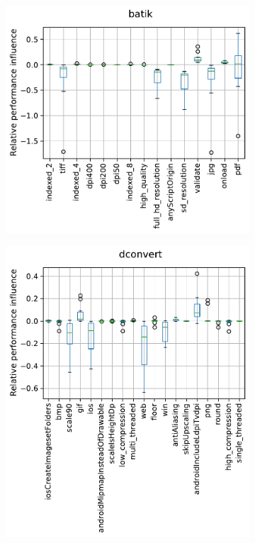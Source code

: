 \begin{figure}
	\begin{minipage}{0.33\textwidth}
		\begin{subfigure}{\linewidth}
			\includegraphics[width=\linewidth]{images/rq2/relative_performance_batik.pdf}			
			\vspace{15mm}
		\end{subfigure}
	\end{minipage}
	\begin{minipage}{0.33\textwidth}
		\begin{subfigure}{\linewidth}
			\includegraphics[width=\linewidth]{images/rq2/relative_performance_dconvert.pdf}

\end{subfigure}
\end{minipage}
\end{figure}
